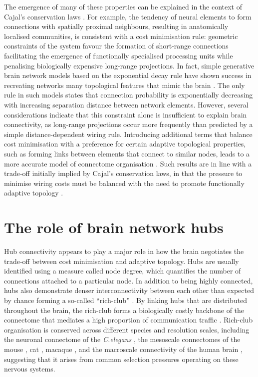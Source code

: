 The emergence of many of these properties can be explained in the context of Cajal's conservation laws \citep{RamonyCajal1995}. For example, the tendency of neural elements to form connections with spatially proximal neighbours, resulting in anatomically localised communities, is consistent with a cost minimisation rule: geometric constraints of the system favour the formation of short-range connections facilitating the emergence of functionally specialised processing units while penalising biologically expensive long-range projections. In fact, simple generative brain network models based on the exponential decay rule have shown success in recreating networks many topological features that mimic the brain \citep{Ercsey-Ravasz2013,Henderson2014}. The only rule in such models states that connection probability is exponentially decreasing with increasing separation distance between network elements. However, several considerations indicate that this constraint alone is insufficient to explain brain connectivity, as long-range projections occur more frequently than predicted by a simple distance-dependent wiring rule. Introducing additional terms that balance cost minimisation with a preference for certain adaptive topological properties, such as forming links between elements that connect to similar nodes, leads to a more accurate model of connectome organisation \citep{Betzel2016,Vertes2012}. Such results are in line with a trade-off initially implied by Cajal's conservation laws, in that the pressure to minimise wiring costs must be balanced with the need to promote functionally adaptive topology \mbox{\citep{Bullmore2012}}.

\section{The role of brain network hubs}

Hub connectivity appears to play a major role in how the brain negotiates the trade-off between cost minimisation and adaptive topology. Hubs are usually identified using a measure called node degree, which quantifies the number of connections attached to a particular node. In addition to being highly connected, hubs also demonstrate denser interconnectivity between each other than expected by chance forming a so-called ``rich-club'' \citep{Fulcher2016,Harriger2012,Towlson2013,VandenHeuvel2011,Zamora-Lopez2010}. By linking hubs that are distributed throughout the brain, the rich-club forms a biologically costly backbone of the connectome that mediates a high proportion of communication traffic \citep{VandenHeuvel2012,Misic2014}. Rich-club organisation is conserved across different species and resolution scales, including the neuronal connectome of the \textit{C.elegans} \citep{Towlson2013}, the mesoscale connectomes of the mouse \citep{Oh2014,Fulcher2016}, cat \citep{DeReus2013b}, macaque \citep{Harriger2012}, and the macroscale connectivity of the human brain \citep{VandenHeuvel2011}, suggesting that it arises from common selection pressures operating on these nervous systems.

